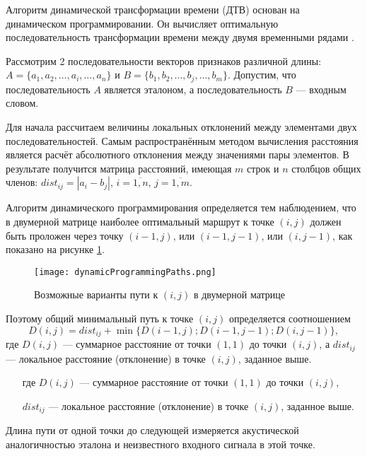 Алгоритм динамической трансформации времени (ДТВ) основан на динамическом программировании.
Он вычисляет оптимальную последовательность трансформации времени между двумя временными рядами \cite{lama2010speech}.

Рассмотрим 2 последовательности векторов признаков различной длины: $A = \{a_1, a_2, \dots, a_i, \dots, a_n\}$ и $B = \{b_1, b_2, \dots, b_j, \dots, b_m\}$.
Допустим, что последовательность $A$ является эталоном, а последовательность $B$ --- входным словом.

Для начала рассчитаем величины локальных отклонений между элементами двух последовательностей.
Самым распространённым методом вычисления расстояния является расчёт абсолютного отклонения между значениями пары элементов.
В результате получится матрица расстояний, имеющая $m$ строк и $n$ столбцов общих членов: $dist_{ij} = |a_i - b_j|$, $i = \overline{1, n}$, $j = \overline{1, m}$.

Алгоритм динамического программирования определяется тем наблюдением, что в двумерной матрице наиболее оптимальный маршрут к точке $(i, j)$ должен быть проложен через точку $(i-1, j)$, или $(i-1, j-1)$, или $(i, j-1)$, как показано на рисунке \ref{fig:dynamicProgrammingPaths}.

\begin{figure}[h]
	\centering
	\texttt{[image: dynamicProgrammingPaths.png]}
	\caption{Возможные варианты пути к $(i, j)$ в двумерной матрице}
	\label{fig:dynamicProgrammingPaths}
\end{figure}

Поэтому общий минимальный путь к точке $(i, j)$ определяется соотношением
\begin{equation}
D(i, j) = dist_{ij} + \min\{D(i-1, j); D(i-1, j-1); D(i, j-1)\},
\end{equation}
где $D(i, j)$ --- суммарное расстояние от точки $(1, 1)$ до точки $(i, j)$, а $dist_{ij}$ --- локальное расстояние (отклонение) в точке $(i, j)$, заданное выше.
\begin{itemize}[align=left,leftmargin=1.8em,itemindent=0pt,labelsep=0pt,labelwidth=1.8em]
	\item[где] $D(i, j)$ --- суммарное расстояние от точки $(1, 1)$ до точки $(i, j)$,
	\item[] $dist_{ij}$ --- локальное расстояние (отклонение) в точке $(i, j)$, заданное выше.
\end{itemize}

Длина пути от одной точки до следующей измеряется акустической аналогичностью эталона и неизвестного входного сигнала в этой точке.

